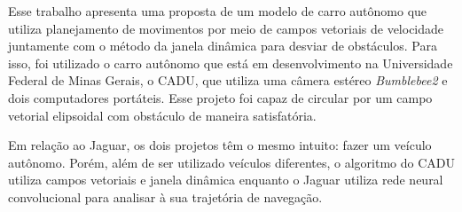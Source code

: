 Esse trabalho apresenta uma proposta de um modelo de carro autônomo que utiliza planejamento de movimentos por meio de campos vetoriais de velocidade juntamente com o método da janela dinâmica para desviar de obstáculos. Para isso, foi utilizado o carro autônomo que está em desenvolvimento na Universidade Federal de Minas Gerais, o CADU, que utiliza uma câmera estéreo \textit{Bumblebee2} e dois computadores portáteis. Esse projeto foi capaz de circular por um campo vetorial elipsoidal com obstáculo de maneira satisfatória. \cite{marcatto2014desenvolvimento}

Em relação ao Jaguar, os dois projetos têm o mesmo intuito: fazer um veículo autônomo. Porém, além de ser utilizado veículos diferentes, o algoritmo do CADU utiliza campos vetoriais e janela dinâmica enquanto o Jaguar utiliza rede neural convolucional para analisar à sua trajetória de navegação.

\begin{comment}
\Gls{ambiguidade}
\Gls{braile}
\Gls{coerencia}
\Gls{dialetos}
\Gls{elipse}
\Gls{locucao-adjetiva}
\Gls{modificadores}
\Gls{paronimos}
\Gls{sintese}
\Gls{borboleta}
\end{comment}